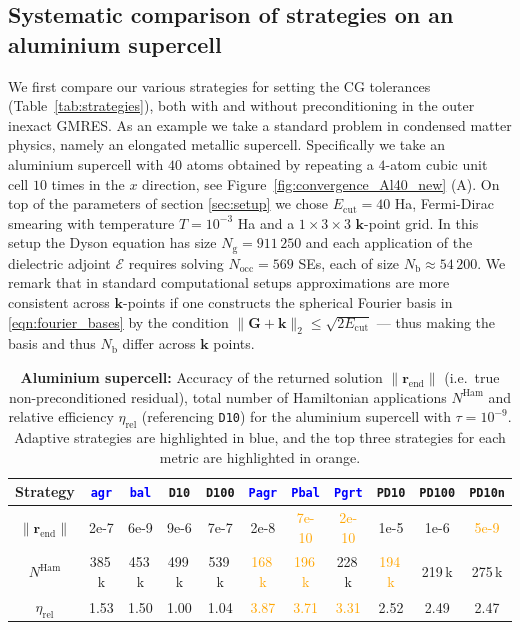 \documentclass[hidelinks,onefignum,onetabnum]{siamart250211}
\newcommand{\Nocc}{N_{\mathrm{occ}}}
\newcommand{\Ecut}{E_{\mathrm{cut}}}
\newcommand{\Nb}{N_{\mathrm{b}}}
\newcommand{\Ng}{N_{\mathrm{g}}}
\newcommand{\Nham}{N^{\mathrm{Ham}}}
\newcommand{\releta}{\eta_{\mathrm{rel}}}
\newcommand{\rend}{\bm r_\text{end}}
\newcommand{\sbal}{\texttt{bal}\xspace}
\newcommand{\sagr}{\texttt{agr}\xspace}
\newcommand{\sdten}{\texttt{D10}\xspace}
\newcommand{\sdhun}{\texttt{D100}\xspace}
\newcommand{\sPbal}{\texttt{Pbal}\xspace}
\newcommand{\sPagr}{\texttt{Pagr}\xspace}
\newcommand{\sPgrt}{\texttt{Pgrt}\xspace}
\newcommand{\sPdten}{\texttt{PD10}\xspace}
\newcommand{\sPdhun}{\texttt{PD100}\xspace}
\newcommand{\sPdnorm}{\texttt{PD10n}\xspace}
\begin{document}
%
%
%
\subsection{Systematic comparison of strategies on an aluminium supercell}\label{sec:Al}
We first compare our various strategies for setting
the CG tolerances (Table~\ref{tab:strategies}),
both with and without preconditioning in the outer inexact GMRES.
As an example we take a standard problem in condensed matter physics,
namely an elongated metallic supercell.
Specifically we take an aluminium supercell with $40$ atoms
obtained by repeating a $4$-atom cubic unit cell $10$ times in the $x$ direction,
see Figure~\ref{fig:convergence_Al40_new} (A).
On top of the parameters of section \ref{sec:setup} we chose $\Ecut = 40$ Ha,
Fermi-Dirac smearing with temperature $T=10^{-3}$ Ha and a
$1\times 3\times 3$ $\bm k$-point grid. In this setup the Dyson equation has size
$\Ng = 911\,250$ and each application of the dielectric adjoint
$\bm{\mathcal E}$ requires solving $\Nocc = 569$ SEs, each of
size $\Nb \approx 54\,200$.
We remark that in standard computational setups approximations are more consistent
across $\bm k$-points if one constructs the spherical Fourier basis in \eqref{eqn:fourier_bases}
by the condition $\| \bm{G} + \bm{k} \|_2 \leq \sqrt{2 \Ecut}$
--- thus making the basis and thus $\Nb$ differ across $\bm k$ points.
%

\begin{table}
  \centering
  \smaller
  \begin{tabular}{c|cccc|cccccc}
    \toprule
    Strategy         & \textcolor{blue}{\sagr}    & \textcolor{blue}{\sbal}    & \sdten    & \sdhun    & \textcolor{blue}{\sPagr}    & \textcolor{blue}{\sPbal}   & \textcolor{blue}{\sPgrt}    & \sPdten    & \sPdhun   & \sPdnorm \\
    \midrule
    $\|\rend\|$     & 2e-7        & 6e-9        & 9e-6        & 7e-7        & 2e-8        & \textcolor{orange}{7e-10}  & \textcolor{orange}{2e-10}  & 1e-5        & 1e-6        & \textcolor{orange}{5e-9}   \\
    $\Nham$      & 385\,k      & 453\,k      & 499\,k      & 539\,k      & \textcolor{orange}{168\,k} & \textcolor{orange}{196\,k} & 228\,k      & \textcolor{orange}{194\,k} & 219\,k      & 275\,k      \\
    $\releta$ & 1.53                  & 1.50                  & 1.00                  & 1.04                  & \textcolor{orange}{3.87}             & \textcolor{orange}{3.71}             & \textcolor{orange}{3.31}             & 2.52                  & 2.49                  & 2.47                  \\
    \bottomrule
  \end{tabular}
  \caption{\textbf{Aluminium supercell:} Accuracy of the returned solution
      $\|\rend\|$ (i.e.~true non-preconditioned residual),
  total number of Hamiltonian applications $\Nham$ and relative
  efficiency $\releta$ (referencing \sdten) for the
  aluminium supercell with $\tau = 10^{-9}$. Adaptive strategies are
  highlighted in blue, and the top three strategies for each metric are
  highlighted in orange.}
  \label{tab:summary_Al10_20_-9}
\end{table}
\end{document}
